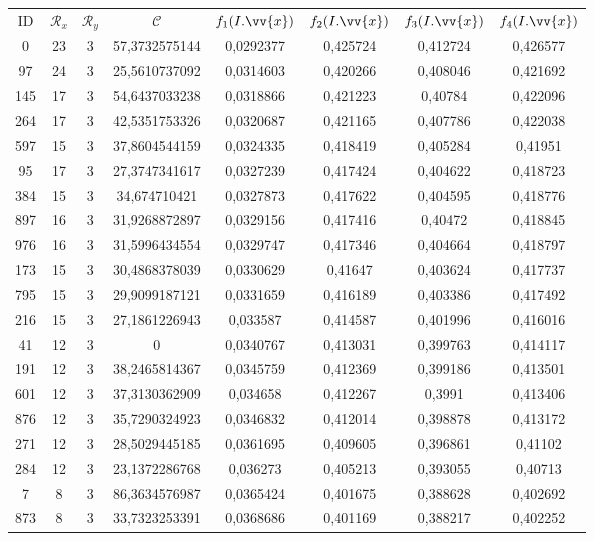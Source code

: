\scriptsize
\begin{longtable}{|c|c|c|c|c|c|c|c|}
\hline
ID & $\mathscr{R}_x$ & $\mathscr{R}_y$ & $\mathscr{C}$ & $f_1(I.\vv{x})$ & $f_2(I.\vv{x})$ & $f_3(I.\vv{x})$ & $f_4(I.\vv{x})$ \\
0 & 23 & 3 & 57,3732575144 & 0,0292377 & 0,425724 & 0,412724 & 0,426577 \\
97 & 24 & 3 & 25,5610737092 & 0,0314603 & 0,420266 & 0,408046 & 0,421692 \\
145 & 17 & 3 & 54,6437033238 & 0,0318866 & 0,421223 & 0,40784 & 0,422096 \\
264 & 17 & 3 & 42,5351753326 & 0,0320687 & 0,421165 & 0,407786 & 0,422038 \\
597 & 15 & 3 & 37,8604544159 & 0,0324335 & 0,418419 & 0,405284 & 0,41951 \\
95 & 17 & 3 & 27,3747341617 & 0,0327239 & 0,417424 & 0,404622 & 0,418723 \\
384 & 15 & 3 & 34,674710421 & 0,0327873 & 0,417622 & 0,404595 & 0,418776 \\
897 & 16 & 3 & 31,9268872897 & 0,0329156 & 0,417416 & 0,40472 & 0,418845 \\
976 & 16 & 3 & 31,5996434554 & 0,0329747 & 0,417346 & 0,404664 & 0,418797 \\
173 & 15 & 3 & 30,4868378039 & 0,0330629 & 0,41647 & 0,403624 & 0,417737 \\
795 & 15 & 3 & 29,9099187121 & 0,0331659 & 0,416189 & 0,403386 & 0,417492 \\
216 & 15 & 3 & 27,1861226943 & 0,033587 & 0,414587 & 0,401996 & 0,416016 \\
41 & 12 & 3 & 0 & 0,0340767 & 0,413031 & 0,399763 & 0,414117 \\
191 & 12 & 3 & 38,2465814367 & 0,0345759 & 0,412369 & 0,399186 & 0,413501 \\
601 & 12 & 3 & 37,3130362909 & 0,034658 & 0,412267 & 0,3991 & 0,413406 \\
876 & 12 & 3 & 35,7290324923 & 0,0346832 & 0,412014 & 0,398878 & 0,413172 \\
271 & 12 & 3 & 28,5029445185 & 0,0361695 & 0,409605 & 0,396861 & 0,41102 \\
284 & 12 & 3 & 23,1372286768 & 0,036273 & 0,405213 & 0,393055 & 0,40713 \\
7 & 8 & 3 & 86,3634576987 & 0,0365424 & 0,401675 & 0,388628 & 0,402692 \\
873 & 8 & 3 & 33,7323253391 & 0,0368686 & 0,401169 & 0,388217 & 0,402252 \\

\end{longtable}
